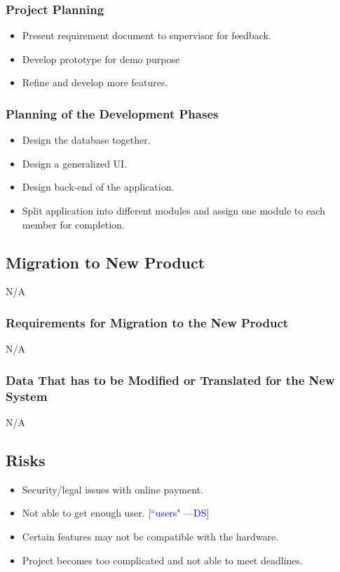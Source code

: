 \documentclass[12pt, titlepage]{article}
\newcommand{\authornote}[3]{\textcolor{#1}{[#3 ---#2]}}
\newcommand{\authornote}[3]{}
\newcommand{\ds}[1]{\authornote{blue}{DS}{#1}}
\begin{document}
{\subsubsection{Project Planning}
\begin{itemize}
  \item Present requirement document to supervisor for feedback.
  \item Develop prototype for demo purpose
  \item Refine and develop more features.
\end{itemize}
\subsubsection{Planning of the Development Phases}
\begin{itemize}
    \item Design the database together.
    \item Design a generalized UI.
    \item Design back-end of the application.
    \item Split application into different modules and assign one module to each 
member for completion.
    
\end{itemize}
\subsection{Migration to New Product}
N/A
\subsubsection{Requirements for Migration to the New Product}
N/A
\subsubsection{Data That has to be Modified or Translated for the New System}
N/A
\subsection{Risks}
\begin{itemize}
  \item Security/legal issues with online payment.
  \item Not able to get enough user. \ds{``users"}
  \item Certain features may not be compatible with the hardware.
  \item Project becomes too complicated and not able to meet deadlines.
\end{itemize}
}
\end{document}
